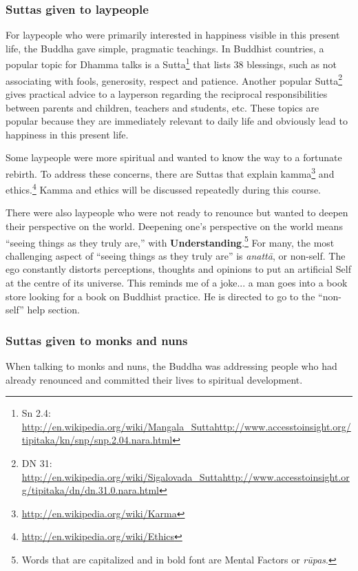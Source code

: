 \subsubsection*{Suttas given to laypeople}

For laypeople who were primarily interested in happiness visible in this present life, the Buddha gave simple, pragmatic teachings. In Buddhist countries, a popular topic for Dhamma talks is a Sutta\footnote{Sn 2.4: \url{http://en.wikipedia.org/wiki/Mangala_Sutta}\newline \url{http://www.accesstoinsight.org/tipitaka/kn/snp/snp.2.04.nara.html}} that lists 38 blessings, such as not associating with fools, generosity, respect and patience. Another popular Sutta\footnote{DN 31: \url{http://en.wikipedia.org/wiki/Sigalovada_Sutta}\newline \url{http://www.accesstoinsight.org/tipitaka/dn/dn.31.0.nara.html}} gives practical advice to a layperson regarding the reciprocal responsibilities between parents and children, teachers and students, etc. These topics are popular because they are immediately relevant to daily life and obviously lead to happiness in this present life.

Some laypeople were more spiritual and wanted to know the way to a fortunate rebirth. To address these concerns, there are Suttas that explain kamma\footnote{\url{http://en.wikipedia.org/wiki/Karma}} and ethics.\footnote{\url{http://en.wikipedia.org/wiki/Ethics}} Kamma and ethics will be discussed repeatedly during this course.

There were also laypeople who were not ready to renounce but wanted to deepen their perspective on the world. Deepening one’s perspective on the world means “seeing things as they truly are,” with \textbf{Understanding}.\footnote{Words that are capitalized and in bold font are Mental Factors or \textit{rūpas}.} For many, the most challenging aspect of “seeing things as they truly are” is \textit{anattā}, or non-self. The ego constantly distorts perceptions, thoughts and opinions to put an artificial Self at the centre of its universe. This reminds me of a joke... a man goes into a book store looking for a book on Buddhist practice. He is directed to go to the “non-self” help section.

\subsubsection*{Suttas given to monks and nuns}

When talking to monks and nuns, the Buddha was addressing people who had already renounced and committed their lives to spiritual development.

